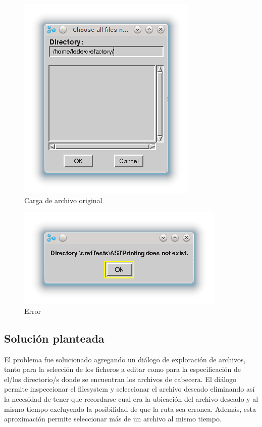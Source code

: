 \documentclass[a4paper,oneside,12pt]{article}
\begin{document}
\begin{figure}[h!]
  \centering
    \includegraphics[scale=0.85]{images/codigo_original/carga.png}
    \caption{Carga de archivo original}
    \label{carga_original}
\end{figure}

\begin{figure}[h!]
  \centering
    \includegraphics[scale=0.85]{images/codigo_original/error.png}
    \caption{Error}
    \label{error}
\end{figure}

\subsection{Soluci\'on planteada}
El problema fue solucionado agregando un di\'alogo de exploraci\'on de archivos, tanto para la selecci\'on de los ficheros a editar como para la especificaci\'on de el/los directorio/s donde se encuentran los archivos de cabecera. El di\'alogo permite inspeccionar el filesystem y seleccionar el archivo deseado eliminando as\'i la necesidad de tener que recordarse cual era la ubicaci\'on del archivo deseado y al mismo tiempo excluyendo la posibilidad de que la ruta sea erronea. Adem\'as, esta aproximaci\'on permite seleccionar m\'as de un archivo al mismo tiempo.
\end{document}
